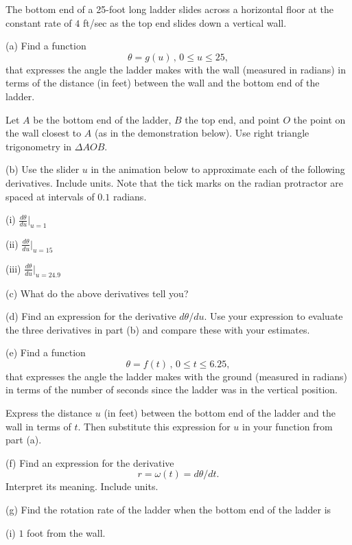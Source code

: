 \documentclass{ximera}
\begin{document}
\begin{question}  \label{Q:dsdfkkkfdvg4}

The bottom end of a 25-foot long ladder slides across a horizontal floor at the constant rate of $4$ ft/sec as the top end slides down a vertical wall. 

(a) Find a function
\[
      \theta = g(u) \, , \, 0\leq u \leq 25 ,
\]
that expresses the angle the ladder makes with the wall (measured in radians) in terms of the distance (in feet) between the wall 
and the bottom end of the ladder.

\begin{hint}
Let $A$ be the bottom end of the ladder, $B$ the top end, and point $O$ the point on the wall closest to $A$ (as in the demonstration below). Use right triangle trigonometry in $\Delta AOB$.
\end{hint}

(b) Use the slider $u$ in the animation below to approximate each of the following derivatives. Include units. Note that the tick marks on the radian protractor are spaced at intervals of $0.1$ radians.

   (i) $\frac{d\theta}{du} \Big|_{u=1}$

   (ii) $\frac{d\theta}{du} \Big|_{u=15}$

    (iii) $\frac{d\theta}{du} \Big|_{u=24.9}$

(c) What do the above derivatives tell you?

(d) Find an expression for the derivative $d\theta/du$. Use your expression to evaluate the three derivatives in part (b) and compare these with your estimates.

(e) Find a function 
\[
       \theta = f(t) \, , \, 0\leq t \leq 6.25 ,
\]
that expresses the angle the ladder makes with the ground (measured in radians) in terms of the number of seconds since the ladder was in the vertical position.
\begin{hint}
Express the distance $u$ (in feet) between the bottom end of the ladder and the wall in terms of $t$. Then substitute this expression for $u$ in your function from part (a). 
\end{hint}

(f) Find an expression for the derivative 
\[
   r=\omega(t)=d\theta/dt. 
\]
Interpret its meaning. Include units.

(g) Find the rotation rate of the ladder when the bottom end of the ladder is 

     (i) $1$ foot from the wall. 


\end{question}
\end{document}
